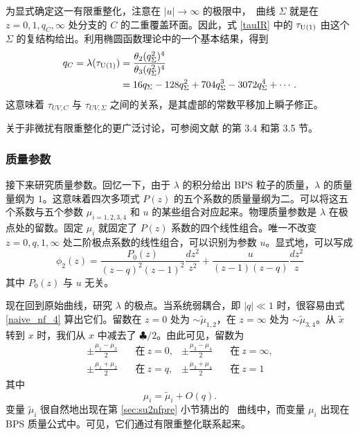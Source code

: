 为显式确定这一有限重整化，注意在 $|u|\to\infty$ 的极限中，\SeibergWitten\ 曲线 $\Sigma$ 就是在 $z=0,1,q_C,\infty$ 处分支的 $C$ 的二重覆盖环面。因此，式 \eqref{tauIR} 中的 $\tau_{{\mathrm{U}}(1)}$ 由这个 $\Sigma$ 的复结构给出。利用椭圆函数理论中的一个基本结果，得到
\begin{equation}
\begin{aligned}
q_C=\lambda(\tau_{{\mathrm{U}}(1)})&=\frac{\theta_2(q_\Sigma^2)^4}{\theta_3(q_\Sigma^2)^4}\\
&=16q_\Sigma-128q_\Sigma^2+704q_\Sigma^3-3072q_\Sigma^4+\cdots.
\end{aligned}
\end{equation}
这意味着 $\tau_{UV,C}$ 与 $\tau_{UV,\Sigma}$ 之间的关系，是其虚部的常数平移加上瞬子修正。

关于非微扰有限重整化的更广泛讨论，可参阅文献 \cite{JaewonThesis} 的第 3.4 和第 3.5 节。

\subsubsection{质量参数}
接下来研究质量参数。回忆一下，由于 $\lambda$ 的积分给出 BPS 粒子的质量，$\lambda$ 的质量量纲为 $1$。这意味着四次多项式 $P(z)$ 的五个系数的质量量纲为二。可以将这五个系数与五个参数 $\mu_{i=1,2,3,4}$ 和 $u$ 的某些组合对应起来。物理质量参数是 $\lambda$ 在极点处的留数。固定 $\mu_i$ 就固定了 $P(z)$ 系数的四个线性组合。唯一不改变 $z=0,q,1,\infty$ 处二阶极点系数的线性组合，可以识别为参数 $u$。显式地，可以写成
\begin{equation}
\phi_2(z)=\frac{P_0(z)}{(z-q)^2(z-1)^2}\frac{dz^2}{z^2}+\frac{u}{(z-1)(z-q)}\frac{dz^2}z
\end{equation}
其中 $P_0(z)$ 与 $u$ 无关。

现在回到原始曲线，研究 $\lambda$ 的极点。当系统弱耦合，即 $|q|\ll1$ 时，很容易由式 \eqref{naive_nf_4} 算出它们。留数在 $z=0$ 处为 $\sim\tilde\mu_{1,2}$，在 $z=\infty$ 处为 $\sim\tilde\mu_{3,4}$。从 $\tilde x$ 转到 $x$ 时，我们从 $x$ 中减去了 $\clubsuit/2$。由此可见，留数为
\begin{equation}
\begin{aligned}
\pm\frac{\mu_1-\mu_2}2&\quad\text{在}\ z=0, &
\pm\frac{\mu_3-\mu_4}2&\quad\text{在}\ z=\infty,\\
\pm\frac{\mu_1+\mu_2}2&\quad\text{在}\ z=q, &
\pm\frac{\mu_3+\mu_4}2&\quad\text{在}\ z=1
\end{aligned}\label{so8masses}
\end{equation}
其中
\begin{equation}
\mu_i=\tilde\mu_i+O(q).
\end{equation}
变量 $\tilde\mu_i$ 很自然地出现在第 \ref{sec:su2nfpre} 小节猜出的 \SeibergWitten\ 曲线中，而变量 $\mu_i$ 出现在 BPS 质量公式中。可见，它们通过有限重整化联系起来。

